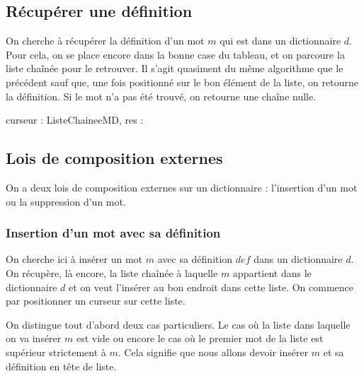 \documentclass[a4paper, titlepage]{livret} %
\begin{document}
			\subsection{Récupérer une définition}
				On cherche à récupérer la définition d'un mot $m$ qui est dans un dictionnaire $d$.
				Pour cela, on se place encore dans la bonne case du tableau, et on parcoure la liste chaînée pour le retrouver.
				Il s'agit quasiment du même algorithme que le précédent sauf que, une fois positionné sur le bon élément de la liste, on retourne la définition.
				Si le mot n'a pas été trouvé, on retourne une chaîne nulle.\\
				\begin{algorithme}
					{curseur : ListeChaineeMD, res : \chaine}{
					}
				\end{algorithme}

			\subsection{Lois de composition externes}
				On a deux lois de composition externes sur un dictionnaire : l'insertion d'un mot ou la suppression d'un mot.

				\subsubsection{Insertion d'un mot avec sa définition}
					On cherche ici à insérer un mot $m$ avec sa définition $def$ dans un dictionnaire $d$.
					On récupère, là encore, la liste chaînée à laquelle $m$ appartient dans le dictionnaire $d$ et on veut l'insérer au bon endroit dans cette liste.
					On commence par positionner un curseur sur cette liste.

					On distingue tout d'abord deux cas particuliers.
					Le cas où la liste dans laquelle on va insérer $m$ est vide ou encore le cas où le premier mot de la liste est supérieur strictement à $m$.
					Cela signifie que nous allons devoir insérer $m$ et sa définition en tête de liste.
\end{document}
